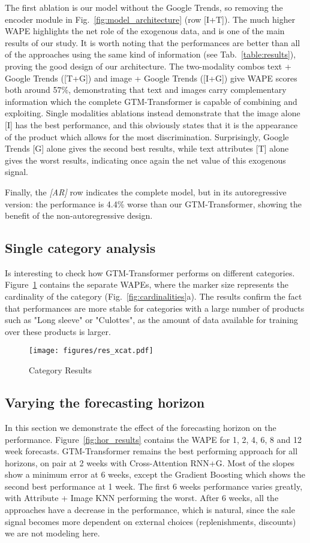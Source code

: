\documentclass{article}
\newcommand{\approachname}[0] {GTM-Transformer\xspace}
\begin{document}
The first ablation is our model without the Google Trends, so removing the encoder module in Fig.~\ref{fig:model_architecture} (row [I+T]). The much higher WAPE  highlights the net role of the exogenous data, and is one of the main results of our study. It is worth noting that the performances are better than all of the approaches using the same kind of information (see Tab.~\ref{table:results}), proving the good design of our architecture.
The two-modality combos text + Google Trends ([T+G]) and image + Google Trends ([I+G]) give WAPE scores both around 57\%, demonstrating that text and images carry complementary information which the complete \approachname is capable of combining and exploiting.
Single modalities ablations instead demonstrate that the image alone [I] has the best performance, and this obviously states that it is the appearance of the product which allows for the most discrimination. Surprisingly, Google Trends [G] alone gives the second best results, while text attributes [T] alone gives the worst results, indicating once again the net value of this exogenous signal.   

Finally, the \emph{[AR]} row indicates the complete model, but in its autoregressive version: the performance is 4.4\% worse than our \approachname, showing the benefit of the non-autoregressive design.


\subsection{Single category analysis}\label{sec:exp:cat}
Is interesting to check how \approachname performs on different categories. Figure~\ref{fig:category_results} contains the separate WAPEs, where the marker size represents the cardinality of the category (Fig.~\ref{fig:cardinalities}a). The results confirm the fact that performances are more stable for categories with a large number of products such as "Long sleeve" or "Culottes", as the amount of data available for training over these products is larger.

\begin{figure}[h]
    \centering
    \texttt{[image: figures/res\_xcat.pdf]}
     \caption{Category Results}
    \label{fig:category_results}
\end{figure}


\subsection{Varying the forecasting horizon}\label{sec:exp:hor}
In this section we demonstrate the effect of the forecasting horizon on the performance. Figure~\ref{fig:hor_results} contains the WAPE for 1, 2, 4, 6, 8 and 12 week forecasts.  \approachname remains the best performing approach for all horizons, on pair at 2 weeks with Cross-Attention RNN+G. Most of the slopes show a minimum error at 6 weeks, except the Gradient Boosting which shows the second best performance at 1 week. The first 6 weeks performance varies greatly, with Attribute + Image KNN performing the worst. After 6 weeks, all the approaches have a decrease in the performance, which is natural, since the sale signal becomes more dependent on external choices (replenishments, discounts) we are not modeling here.
\end{document}
